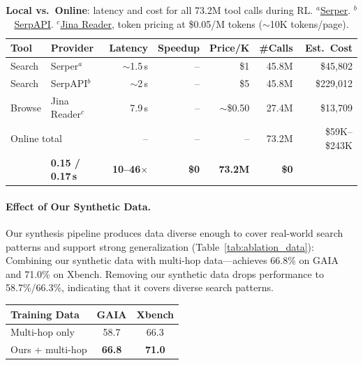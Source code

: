 \documentclass{article} %
\theoremstyle{plain}
\theoremstyle{definition}
\theoremstyle{remark}
\begin{document}
\begin{table}[h]
    \centering
    \small
    \setlength{\tabcolsep}{5pt}
    \renewcommand{\arraystretch}{1.1}
    \begin{tabular}{ll rrrrr}
        \toprule
        \textbf{Tool} & \textbf{Provider} & \textbf{Latency} & \textbf{Speedup} & \textbf{Price/K} & \textbf{\#Calls} & \textbf{Est.\ Cost} \\
        \midrule
        Search & Serper$^{a}$ & $\sim$1.5\,s & -- & \$1 & 45.8M & \$45,802 \\
        Search & SerpAPI$^{b}$ & $\sim$2\,s & -- & \$5 & 45.8M & \$229,012 \\
        Browse & Jina Reader$^{c}$ & 7.9\,s & -- & $\sim$\$0.50 & 27.4M & \$13,709 \\
        \midrule
        \multicolumn{2}{l}{Online total} & -- & -- & -- & 73.2M & \$59K--\$243K \\
        \rowcolor{blue!8}
        \multicolumn{2}{l}{\textbf{Ours (fully local)}} & \textbf{0.15 / 0.17\,s} & \textbf{10--46$\times$} & \textbf{\$0} & \textbf{73.2M} & \textbf{\$0} \\
        \bottomrule
    \end{tabular}
    \caption{\textbf{Local vs.\ Online}: latency and cost for all 73.2M tool calls during RL. $^{a}$\href{https://serper.dev}{Serper}. $^{b}$\href{https://serpapi.com}{SerpAPI}. $^{c}$\href{https://jina.ai/reader}{Jina Reader}, token pricing at \$0.05/M tokens ($\sim$10K tokens/page).}
    \label{tab:local_vs_online}
\end{table}

\noindent
\begin{minipage}[t]{0.55\textwidth}
    \paragraph{Effect of Our Synthetic Data.}
    Our synthesis pipeline produces data diverse enough to cover real-world search patterns and support strong generalization (Table~\ref{tab:ablation_data}): Combining our synthetic data with multi-hop data---achieves 66.8\% on GAIA and 71.0\% on Xbench. Removing our synthetic data drops performance to 58.7\%/66.3\%, indicating that it covers diverse search patterns.
\end{minipage}
\hfill
\begin{minipage}[t]{0.4\textwidth}
    \vspace{0.3em}
    \centering
    \small
    \setlength{\tabcolsep}{6pt}
    \begin{tabular}{lcc}
        \toprule
        \textbf{Training Data} & \textbf{GAIA} & \textbf{Xbench} \\
        \midrule
        Multi-hop only & 58.7 & 66.3 \\
        Ours + multi-hop & \textbf{66.8} & \textbf{71.0} \\
        \bottomrule
    \end{tabular}
    \label{tab:ablation_data}
\end{minipage}
\end{document}
